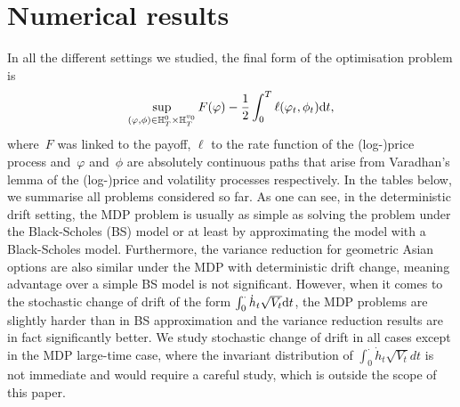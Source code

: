 \section{Numerical results}\label{sec:Num_results}
In all the different settings we studied, the final form of the optimisation problem is
$$
\sup_{(\varphi, \phi)\in \mathbb{H}_T^0\times \mathbb{H}_T^{v_0}}F(\varphi) - \frac{1}{2}\int_0^T\ell(\varphi_t,\phi_t)\mathrm{d} t,
$$
where~$F$ was linked to the payoff, $\ell$ to the rate function of the (log-)price process and~$\varphi$ and~$\phi$ are absolutely continuous paths that arise from Varadhan's lemma of the (log-)price and volatility processes respectively.
In the tables below, we summarise all problems considered so far. As one can see, in the deterministic drift setting, the MDP problem is usually as simple as solving the problem under the Black-Scholes (BS) model or at least by approximating the model with a Black-Scholes model. Furthermore, the variance reduction for geometric Asian options are also similar under the MDP with deterministic drift change, meaning advantage over a simple BS model is not significant. However, when it comes to the stochastic change of drift of the form $\int_0^\cdot\dot{h}_t\sqrt{V_t}\mathrm{d} t$, the MDP problems are slightly harder than in BS approximation and the variance reduction results are in fact significantly better. We study stochastic change of drift in all cases except in the MDP large-time case, where the invariant distribution of $\int_0^\cdot \dot{h}_{t}\sqrt{V_t}dt$ is not immediate and would require a careful study, which is outside the scope of this paper.
\begin{table}[H]
\centering
\caption{Summary of the optimisations with \textit{deterministic} change of drift. %
}
\end{table}

